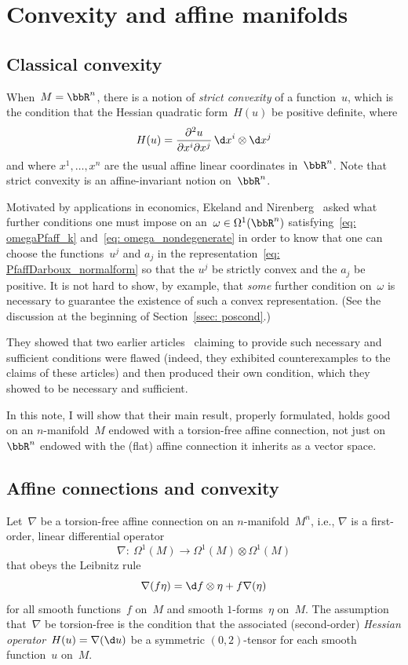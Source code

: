 \section{Convexity and affine manifolds}

\subsection{Classical convexity}
When~$M=\bbR^n$, there is a notion of \emph{strict convexity}
of a function~$u$, which is the condition
that the Hessian quadratic form~$H(u)$ be positive definite, where
\begin{equation}\label{eq: flat_Hessian}
H(u) = {\frac{\partial^2 u}{\partial x^i\partial x^j}}
\,\d x^i\otimes\d x^j
\end{equation}
and where $x^1,\ldots,x^n$
are the usual affine linear coordinates in~$\bbR^n$.
Note that strict convexity is an affine-invariant notion on~$\bbR^n$.

Motivated by applications in economics,
Ekeland and Nirenberg~\cite{MR2023129}
asked what further conditions one must impose on an~$\omega\in\Omega^1(\bbR^n)$
satisfying~\eqref{eq: omegaPfaff_k} and~\eqref{eq: omega_nondegenerate}
in order to know that one can choose the functions~$u^j$
and $a_j$ in the representation~\eqref{eq: PfaffDarboux_normalform}
so that the $u^j$ be strictly convex and the $a_j$ be positive.
It is not hard to show, by example, that \emph{some}
further condition on~$\omega$ is necessary
to guarantee the existence of such a convex representation.
(See the discussion at the beginning of Section~\ref{ssec: poscond}.)

They showed that two earlier articles~\cite{MR1655519,MR1652709}
claiming to provide such necessary and sufficient conditions were flawed
(indeed, they exhibited counterexamples to the claims of these articles)
and then produced their own condition,
which they showed to be necessary and sufficient.

In this note, I will show that their main result,
properly formulated, holds good on an $n$-manifold~$M$
endowed with a torsion-free affine connection,
not just on~$\bbR^n$ endowed with the (flat) affine connection
it inherits as a vector space.

\subsection{Affine connections and convexity}

Let~$\nabla$ be a torsion-free affine connection on an $n$-manifold~$M^n$,
i.e., $\nabla$ is a first-order, linear differential operator
\begin{equation*}
\nabla \colon \ \Omega^1(M)\to \Omega^1(M)\otimes \Omega^1(M)
\end{equation*}
that obeys the Leibnitz rule
\begin{equation*}
\nabla (f\eta) = \d f\otimes\eta + f \nabla(\eta)
\end{equation*}
for all smooth functions~$f$ on~$M$ and smooth $1$-forms~$\eta$ on~$M$.
The assumption that~$\nabla$ be torsion-free
is the condition that the associated (second-order)
\emph{Hessian operator}~$H(u)=\nabla(\d u)$
be a symmetric $(0,2)$-tensor for each smooth function~$u$ on~$M$.

